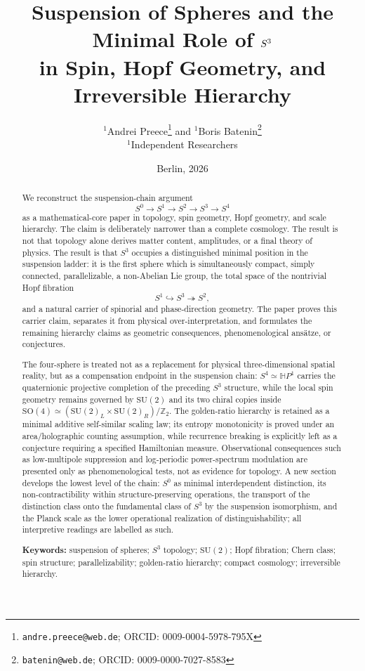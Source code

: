 \documentclass[11pt,a4paper]{article}
\title{\bfseries Suspension of Spheres and the Minimal Role of \texorpdfstring{$\Sthree$}{S3}\\
in Spin, Hopf Geometry, and Irreversible Hierarchy}
\author{%
\texorpdfstring{$^{1}$}{1}Andrei Preece\thanks{\texttt{andre.preece@web.de}; ORCID: 0009-0004-5978-795X}
\quad and \quad
\texorpdfstring{$^{1}$}{1}Boris Batenin\thanks{\texttt{batenin@web.de}; ORCID: 0009-0000-7027-8583}\\[0.35em]
\small \texorpdfstring{$^{1}$}{1}Independent Researchers
}
\date{Berlin, 2026}
\theoremstyle{definition}
\theoremstyle{remark}
\newcommand{\Szero}{S^{0}}
\newcommand{\Sone}{S^{1}}
\newcommand{\Stwo}{S^{2}}
\newcommand{\Sthree}{S^{3}}
\newcommand{\Sfour}{S^{4}}
\newcommand{\HP}{\mathbb{H}P}
\newcommand{\Z}{\mathbb{Z}}
\newcommand{\SU}{\mathrm{SU}}
\newcommand{\SO}{\mathrm{SO}}
\begin{document}
\maketitle

\begin{abstract}
We reconstruct the suspension-chain argument
\[
\Szero \longrightarrow \Sone \longrightarrow \Stwo \longrightarrow \Sthree \longrightarrow \Sfour
\]
as a mathematical-core paper in topology, spin geometry, Hopf geometry, and scale hierarchy.
The claim is deliberately narrower than a complete cosmology.  The result is not that topology
alone derives matter content, amplitudes, or a final theory of physics.  The result is that
$\Sthree$ occupies a distinguished minimal position in the suspension ladder: it is the first
sphere which is simultaneously compact, simply connected, parallelizable, a non-Abelian Lie
group, the total space of the nontrivial Hopf fibration
\[
\Sone \hookrightarrow \Sthree \twoheadrightarrow \Stwo,
\]
and a natural carrier of spinorial and phase-direction geometry.  The paper proves this carrier
claim, separates it from physical over-interpretation, and formulates the remaining hierarchy
claims as geometric consequences, phenomenological ansätze, or conjectures.

The four-sphere is treated not as a replacement for physical three-dimensional spatial reality,
but as a compensation endpoint in the suspension chain: $\Sfour\simeq\HP^{1}$ carries the
quaternionic projective completion of the preceding $\Sthree$ structure, while the local
spin geometry remains governed by $\SU(2)$ and its two chiral copies inside
$\SO(4)\simeq(\SU(2)_{L}\times\SU(2)_{R})/\Z_{2}$.  The golden-ratio hierarchy is retained
as a minimal additive self-similar scaling law; its entropy monotonicity is proved under an
area/holographic counting assumption, while recurrence breaking is explicitly left as a
conjecture requiring a specified Hamiltonian measure.  Observational consequences such as
low-multipole suppression and log-periodic power-spectrum modulation are presented only as
phenomenological tests, not as evidence for topology.  A new section develops the lowest level
of the chain: $\Szero$ as minimal interdependent distinction, its non-contractibility within
structure-preserving operations, the transport of the distinction class onto the fundamental
class of $\Sthree$ by the suspension isomorphism, and the Planck scale as the lower operational
realization of distinguishability; all interpretive readings are labelled as such.

\medskip
\noindent\textbf{Keywords:} suspension of spheres; $\Sthree$ topology; $\SU(2)$; Hopf fibration;
Chern class; spin structure; parallelizability; golden-ratio hierarchy; compact cosmology;
irreversible hierarchy.
\end{abstract}
\end{document}
